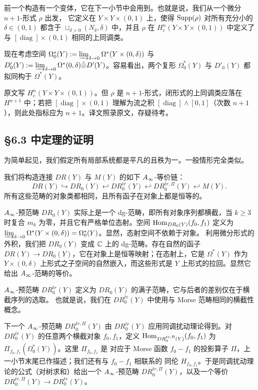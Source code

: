 前一个构造有一个变体，它在下一小节中会用到。也就是说，我们从一个微分 $n+1$-形式 $\rho$ 出发，
它定义在 $Y\times Y\times(0,1)$ 上，使得 $\operatorname{Supp}(\rho)$ 对所有充分小的 $\delta\in(0,1)$ 都含于
$\sqcup_{\delta>0}(N_\delta,\delta)$ 中，并且 $\rho$ 在 $H^n_c(Y\times Y\times(0,1))$ 中定义了与
$[\operatorname{diag}]\times(0,1)$ 相同的上同调类。

现在考虑空间 $\Omega^*_0(Y):=\varinjlim_{\delta\to0}\Omega^*(Y\times(0,\delta))$ 与
$D'_0(Y):=\varinjlim_{\delta\to0}\Omega^*(0,\delta)\hat\otimes D'(Y)$。容易看出，两个复形
$\Omega^*_0(Y)$ 与 $D'_0(Y)$ 都拟同构于 $\Omega^*(Y)$。

\begin{yizhu}[一处上标次数]
原文写 $H^n_c(Y\times Y\times(0,1))$。但 $\rho$ 是 $n+1$-形式，闭形式的上同调类应落在
$H^{n+1}$ 中；若把 $[\operatorname{diag}]\times(0,1)$ 理解为流之积
$[\operatorname{diag}]\wedge[0,1]$（次数 $n+1$），则此处指标应为 $n+1$。译文照录原文，存疑待考。
\end{yizhu}

\subsection{\S6.3 中定理的证明}

为简单起见，我们假定所有局部系统都是平凡的且秩为一。一般情形完全类似。

我们将构造连接 $DR(Y)$ 与 $M(Y)$ 的如下 $A_{\infty}$-等价链：
\[
  DR(Y)\hookrightarrow DR_0(Y)\hookleftarrow DR_0^{tr}(Y)\hookleftarrow DR_0^{tr,\Pi}(Y)
  \hookleftarrow M(Y).
\]
所有这些范畴的对象类都相同，且所有函子在对象上都是恒等的。

$A_{\infty}$-预范畴 $DR_0(Y)$ 实际上是一个 dg-范畴，即所有对象序列都横截，当 $k\ge3$ 时复合 $m_k$
为零，并且它有严格单位态射。空间 $\operatorname{Hom}_{DR_0(Y)}(f_0,f_1)$ 定义为
$\varinjlim_{\delta\to0}\Omega^*(Y\times(0,\delta))=\Omega^*_0(Y)$。显然，态射空间不依赖于对象。
利用微分形式的外积，我们把 $DR_0(Y)$ 变成 $\mathbb{C}$ 上的 dg-范畴。存在自然的函子
$DR(Y)\to DR_0(Y)$，它在对象上是恒等映射；在态射上，它是 $\Omega^*(Y)$ 作为 $Y\times(0,\delta)$
上形式之子空间的自然嵌入，而这些形式是 $Y$ 上形式的拉回。显然它给出 $A_{\infty}$-范畴的等价。

$A_{\infty}$-预范畴 $DR_0^{tr}(Y)$ 定义为 $DR_0(Y)$ 的满子范畴，它与后者的差别仅在于横截序列的选取。
也就是说，我们在 $DR_0^{tr}(Y)$ 中使用与 Morse 范畴相同的横截性概念。

下一个 $A_{\infty}$-预范畴 $DR_0^{tr,\Pi}(Y)$ 由 $DR_0^{tr}(Y)$ 应用同调扰动理论得到。对
$DR_0^{tr}(Y)$ 的任意两个横截对象 $f_0,f_1$，定义
$\operatorname{Hom}_{DR_0^{tr,\Pi}(Y)}(f_0,f_1)$ 为 $\Pi_{f_0,f_1}(\Omega^*_0(Y))$。这里 $\Pi_{f_0,f_1}$ 是
对应于 Morse 函数 $f_0-f_1$ 的投影算子 $\Pi$，上一小节末尾已作描述；我们还有与 $f_0-f_1$ 相联系的
同伦 $H_{f_0,f_1}$。于是同调扰动理论的公式（对树求和）给出一个 $A_{\infty}$-预范畴
$DR_0^{tr,\Pi}(Y)$，以及一个等价 $DR_0^{tr,\Pi}(Y)\to DR_0^{tr}(Y)$。

